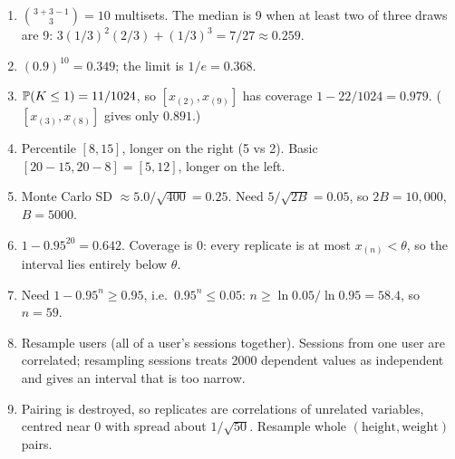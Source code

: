 \begin{enumerate}
  \item $\binom{3+3-1}{3} = 10$ multisets. The median is 9 when at least two of
  three draws are 9: $3(1/3)^2(2/3) + (1/3)^3 = 7/27 \approx 0.259$.
  \item $(0.9)^{10} = 0.349$; the limit is $1/e = 0.368$.
  \item $\P(K \le 1) = 11/1024$, so $[x_{(2)}, x_{(9)}]$ has coverage
  $1 - 22/1024 = 0.979$. ($[x_{(3)}, x_{(8)}]$ gives only $0.891$.)
  \item Percentile $[8, 15]$, longer on the right (5 vs 2). Basic
  $[20 - 15, 20 - 8] = [5, 12]$, longer on the left.
  \item Monte Carlo SD $\approx 5.0/\sqrt{400} = 0.25$. Need
  $5/\sqrt{2B} = 0.05$, so $2B = 10{,}000$, $B = 5000$.
  \item $1 - 0.95^{20} = 0.642$. Coverage is $0$: every replicate is at most
  $x_{(n)} < \theta$, so the interval lies entirely below $\theta$.
  \item Need $1 - 0.95^n \ge 0.95$, i.e.\ $0.95^n \le 0.05$:
  $n \ge \ln 0.05 / \ln 0.95 = 58.4$, so $n = 59$.
  \item Resample users (all of a user's sessions together). Sessions from one
  user are correlated; resampling sessions treats 2000 dependent values as
  independent and gives an interval that is too narrow.
  \item Pairing is destroyed, so replicates are correlations of unrelated
  variables, centred near 0 with spread about $1/\sqrt{50}$. Resample whole
  $(\text{height}, \text{weight})$ pairs.
\end{enumerate}
